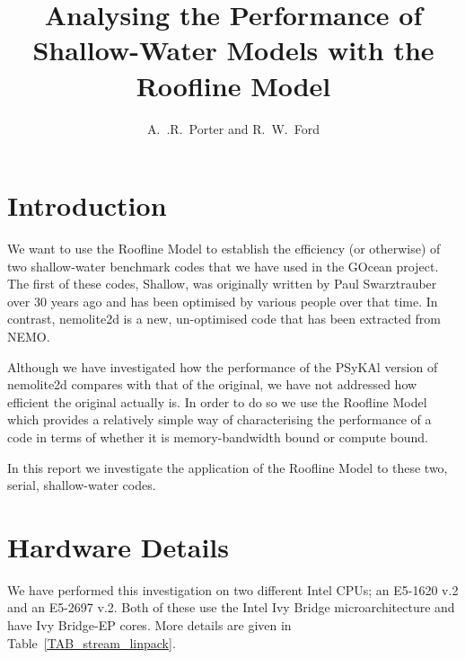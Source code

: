 \documentclass[12pt]{article}
\newcommand{\psykal}{{PS}y{KA}l}
\begin{document}
\title{Analysing the Performance of Shallow-Water Models with the
 Roofline Model}

\author{A.~.R.~Porter and R.~W.~Ford}

\maketitle

\section{Introduction}

We want to use the Roofline Model to establish the efficiency (or
otherwise) of two shallow-water benchmark codes that we have used in
the GOcean project. The first of these codes, Shallow, was originally
written by Paul Swarztrauber over 30 years ago and has been optimised
by various people over that time. In contrast, nemolite2d is a new,
un-optimised code that has been extracted from NEMO.

Although we have investigated how the performance of the \psykal
version of nemolite2d compares with that of the original, we have not
addressed how efficient the original actually is. In order to do so we
use the Roofline Model~\cite{roofline} which provides a relatively
simple way of characterising the performance of a code in terms of
whether it is memory-bandwidth bound or compute bound.

In this report we investigate the application of the Roofline Model to
these two, serial, shallow-water codes.

\section{Hardware Details}

We have performed this investigation on two different Intel CPUs; an
E5-1620 v.2 and an E5-2697 v.2. Both of these use the Intel Ivy Bridge
microarchitecture and have Ivy Bridge-EP cores. More details are given
in Table~\ref{TAB_stream_linpack}.
\end{document}
